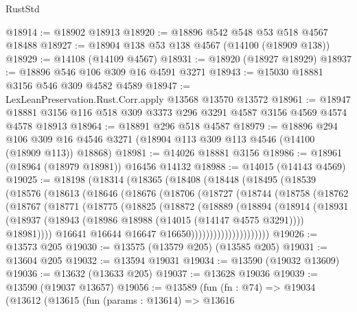 \begin{lexlean}{RustStd}
\begin{coremodule}
@18914 := @18902 @18913
@18920 := @18896 @542 @548 @53 @518 @4567 @18488
@18927 := @18904 @138 @53 @138 @4567 (@14100 (@18909 @138))
@18929 := @14108 (@14109 @4567)
@18931 := @18920 (@18927 @18929)
@18937 := @18896 @546 @106 @309 @16 @4591 @3271
@18943 := @15030 @18881 @3156 @546 @309 @4582 @4589
@18947 := LexLeanPreservation.Rust.Corr.apply @13568 @13570 @13572
@18961 := @18947 @18881 @3156 @116 @518 @309 @3373 @296 @3291 @4587 @3156 @4569 @4574 @4578 @18913
@18964 := @18891 @296 @518 @4587
@18979 := @18896
    @294
    @106
    @309
    @16
    @4546
    @3271
    (@18904 @113 @309 @113 @4546 (@14100 (@18909 @113)) @18868)
@18981 := @14026 @18881 @3156
@18986 := @18961 (@18964 (@18979 @18981)) @16456 @14132
@18988 := @14015 (@14143 @4569)
@19025 := @18198
    (@18314
      (@18365
        (@18408
          (@18448
            (@18495
              (@18539
                (@18576
                  (@18613
                    (@18646
                      (@18676
                        (@18706
                          (@18727
                            (@18744
                              (@18758
                                (@18762
                                  (@18767
                                    (@18771
                                      (@18775
                                        (@18825
                                          (@18872
                                            (@18889
                                              (@18894
                                                (@18914
                                                  (@18931
                                                    (@18937
                                                      (@18943
                                                        (@18986
                                                          @18988
                                                          (@14015 (@14147 @4575 @3291))))
                                                      @18981))))
                                              @16641
                                              @16644
                                              @16647
                                              @16650)))))))))))))))))))))
@19026 := @13573 @205
@19030 := @13575 (@13579 @205) (@13585 @205)
@19031 := @13604 @205
@19032 := @13594 @19031
@19034 := @13590 (@19032 @13609)
@19036 := @13632 (@13633 @205)
@19037 := @13628 @19036
@19039 := @13590 (@19037 @13657)
@19056 := @13589
    (fun (fn : @74) =>
    @19034
      (@13612
        (@13615
          (fun (params : @13614) =>
          @13616

\end{coremodule}
\end{lexlean}
